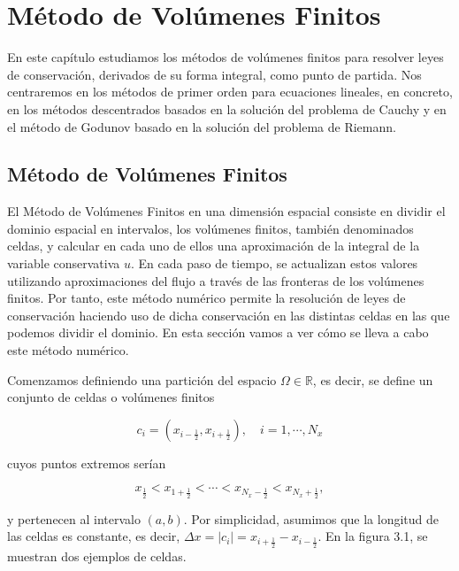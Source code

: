 \chapter{Método de Volúmenes Finitos}

En este capítulo estudiamos los métodos de volúmenes finitos para
resolver leyes de conservación, derivados de su forma integral, como
punto de partida.
Nos centraremos en los métodos de primer orden para ecuaciones
lineales, en concreto, en los métodos descentrados basados en la
solución del problema de Cauchy y en el método de Godunov basado en
la solución del problema de Riemann.

\section{Método de Volúmenes Finitos}

El Método de Volúmenes Finitos en una dimensión espacial consiste en
dividir el dominio espacial en intervalos, los volúmenes finitos,
también denominados celdas, y calcular en cada uno de ellos una
aproximación de la integral de la variable conservativa $u$.
En cada paso de tiempo, se actualizan estos valores utilizando
aproximaciones del ﬂujo a través de las fronteras de los volúmenes
finitos.
Por tanto, este método numérico permite la resolución de leyes de
conservación haciendo uso de dicha conservación en las distintas
celdas en las que podemos dividir el dominio.
En esta sección vamos a ver cómo se lleva a cabo este método
numérico.

Comenzamos definiendo una partición del espacio $\Omega\in\mathbb{R}$,
es decir, se define un conjunto de celdas o volúmenes finitos

\begin{equation*}
    c_{i}=
    \left(
    x_{i-\frac{1}{2}},
    x_{i+\frac{1}{2}}
    \right),\quad i=1,\cdots,N_{x}
\end{equation*}

cuyos puntos extremos serían

\begin{equation*}
    x_{\frac{1}{2}}<
    x_{1+\frac{1}{2}}<
    \cdots<
    x_{N_{x}-\frac{1}{2}}<
    x_{N_{x}+\frac{1}{2}},
\end{equation*}

y pertenecen al intervalo $\left(a,b\right)$.
Por simplicidad, asumimos que la longitud de las celdas es constante,
es decir,
\begin{math}
    \Delta x=
    \left|c_{i}\right|=
    x_{i+\frac{1}{2}}-
    x_{i-\frac{1}{2}}
\end{math}.
En la figura 3.1, se muestran dos ejemplos de celdas.


